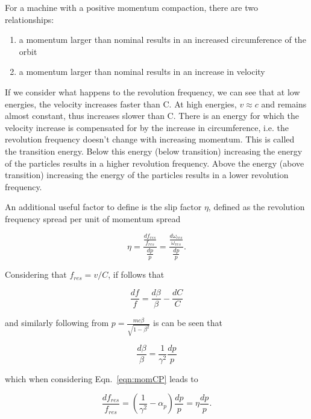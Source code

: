 For a machine with a positive momentum compaction, there are two relationships:

\begin{enumerate}
\item{a momentum larger than nominal results in an increased circumference of the orbit}
\item{a momentum larger than nominal results in an increase in velocity}
\end{enumerate}

If we consider what happens to the revolution frequency, we can see that at low energies, the velocity increases faster than C. At high energies, $v \approx c$ and remains almost constant, thus increases slower than C. There is an energy for which the velocity increase is compensated for by the increase in circumference, i.e. the revolution frequency doesn't change with increasing momentum. This is called the transition energy. Below this energy (below transition) increasing the energy of the particles results in a higher revolution frequency. Above the energy (above transition) increasing the energy of the particles results in a lower revolution frequency.

An additional useful factor to define is the slip factor $\eta$, defined as the revolution frequency spread per unit of momentum spread

\begin{equation}
\eta = \frac{\frac{df_{res}}{f_{res}}}{\frac{dp}{p}} = \frac{\frac{d\omega_{res}}{\omega_{res}}}{\frac{dp}{p}}.
\end{equation}

Considering that $f_{res} = v/C$, if follows that

\begin{equation}
\frac{df}{f} = \frac{d\beta}{\beta} - \frac{dC}{C}
\end{equation}

and similarly following from $p=\frac{mc\beta}{\sqrt{1-\beta^{2}}}$ is can be seen that

\begin{equation}
\frac{d\beta}{\beta} = \frac{1}{\gamma^{2}}\frac{dp}{p}
\end{equation}

which when considering Eqn.~\ref{eqn:momCP} leads to 

\begin{equation}
\frac{df_{res}}{f_{res}} = \left( \frac{1}{\gamma^{2}} -\alpha_{p}\right) \frac{dp}{p} = \eta \frac{dp}{p}.
\end{equation}

